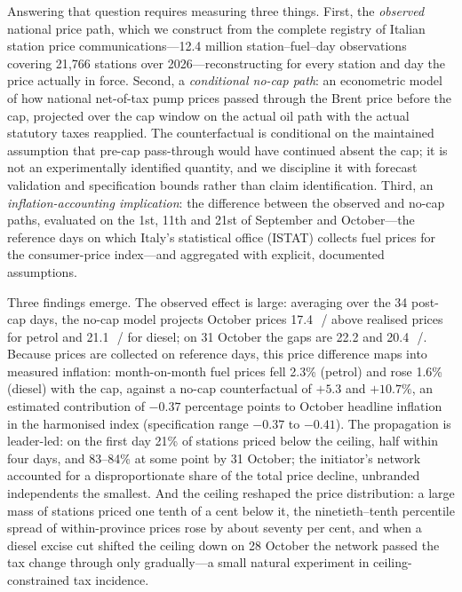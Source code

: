 \documentclass[11pt]{article}
\newcommand{\cl}{\,\text{c}/\text{l}}
\begin{document}
Answering that question requires measuring three things. First, the
\emph{observed} national price path, which we construct from the complete
registry of Italian station price communications---12.4 million
station--fuel--day observations covering 21{,}766 stations over
2026---reconstructing for every station and day the price actually in force. Second, a
\emph{conditional no-cap path}: an econometric model of how national
net-of-tax pump prices passed through the Brent price before the cap,
projected over the cap window on the actual oil path with the actual
statutory taxes reapplied. The counterfactual is conditional on the
maintained assumption that pre-cap pass-through would have continued absent
the cap; it is not an experimentally identified quantity, and we
discipline it with forecast validation and specification bounds rather
than claim identification. Third, an \emph{inflation-accounting
implication}: the difference between the observed and no-cap paths,
evaluated on the 1st, 11th and 21st of September and October---the
reference days on which Italy's statistical office (ISTAT) collects fuel
prices for the consumer-price index---and aggregated with explicit,
documented assumptions.

Three findings emerge. The observed effect is large: averaging over the 34
post-cap days, the no-cap model projects
October prices 17.4~\cl{} above realised prices for petrol and
21.1~\cl{} for diesel; on 31 October the gaps are 22.2 and 20.4~\cl.
Because prices are collected on reference days, this price difference maps
into measured inflation: month-on-month fuel prices fell 2.3\% (petrol) and
rose 1.6\% (diesel) with the cap, against a no-cap counterfactual of $+5.3$
and $+10.7\%$, an estimated contribution of $-0.37$ percentage points to
October headline inflation in the harmonised index (specification range
$-0.37$ to $-0.41$). The
propagation is leader-led: on the first day 21\% of stations priced below
the ceiling, half within four days, and 83--84\% at some point by
31 October; the initiator's network accounted for a disproportionate share
of the total price decline, unbranded independents the smallest. And the
ceiling reshaped the price distribution: a large mass of stations priced
one tenth of a cent below it, the ninetieth--tenth percentile spread of
within-province prices rose by about seventy per cent, and when a diesel
excise cut shifted the ceiling down on 28 October the network passed the
tax change through only gradually---a small natural experiment in
ceiling-constrained tax incidence.
\end{document}
